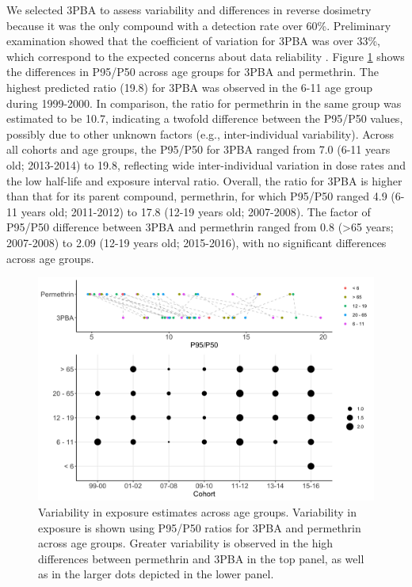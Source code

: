\documentclass[toxics,article,submit,pdftex,moreauthors]{Definitions/mdpi}
\begin{document}
We selected 3PBA to assess variability and differences in reverse
dosimetry because it was the only compound with a detection rate over
60\%. Preliminary examination showed that the coefficient of variation
for 3PBA was over 33\%, which correspond to the expected concerns about
data reliability \citep{faure_evaluation_2020}. Figure \ref{fig:fig5}
shows the differences in P95/P50 across age groups for 3PBA and
permethrin. The highest predicted ratio (19.8) for 3PBA was observed in
the 6-11 age group during 1999-2000. In comparison, the ratio for
permethrin in the same group was estimated to be 10.7, indicating a
twofold difference between the P95/P50 values, possibly due to other
unknown factors (e.g., inter-individual variability). Across all cohorts
and age groups, the P95/P50 for 3PBA ranged from 7.0 (6-11 years old;
2013-2014) to 19.8, reflecting wide inter-individual variation in dose
rates and the low half-life and exposure interval ratio. Overall, the
ratio for 3PBA is higher than that for its parent compound, permethrin,
for which P95/P50 ranged 4.9 (6-11 years old; 2011-2012) to 17.8 (12-19
years old; 2007-2008). The factor of P95/P50 difference between 3PBA and
permethrin ranged from 0.8 (\textgreater65 years; 2007-2008) to 2.09
(12-19 years old; 2015-2016), with no significant differences across age
groups.

\begin{figure}[H]
\includegraphics[width=1\linewidth,]{figures/fig5} \caption{Variability in exposure estimates across age groups. Variability in exposure is shown using P95/P50 ratios for 3PBA and permethrin across age groups. Greater variability is observed in the high differences between permethrin and 3PBA in the top panel, as well as in the larger dots depicted in the lower panel.}\label{fig:fig5}
\end{figure}
\end{document}
